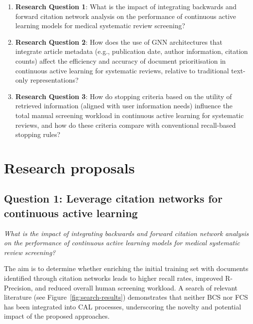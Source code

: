 \documentclass[10pt,oneside]{book}
\begin{document}
\begin{enumerate}
    \item \textbf{Research Question 1}: What is the impact of integrating backwards and forward citation network analysis on the performance of continuous active learning models for medical systematic review screening?
    \item \textbf{Research Question 2}: How does the use of GNN architectures that integrate article metadata (e.g., publication date, author information, citation counts) affect the efficiency and accuracy of document prioritisation in continuous active learning for systematic reviews, relative to traditional text-only representations?
    \item \textbf{Research Question 3}: How do stopping criteria based on the utility of retrieved information (aligned with user information needs) influence the total manual screening workload in continuous active learning for systematic reviews, and how do these criteria compare with conventional recall-based stopping rules?
\end{enumerate}

\section{Research proposals}

\subsection{Question 1: Leverage citation networks for continuous active learning}

\emph{What is the impact of integrating backwards and forward citation network analysis on the performance of continuous active learning models for medical systematic review screening?}

The aim is to determine whether enriching the initial training set with documents identified through citation networks leads to higher recall rates, improved R-Precision, and reduced overall human screening workload. A search of relevant literature (see Figure \ref{fig:search-results}) demonstrates that neither BCS nor FCS has been integrated into CAL processes, underscoring the novelty and potential impact of the proposed approaches.
\end{document}
